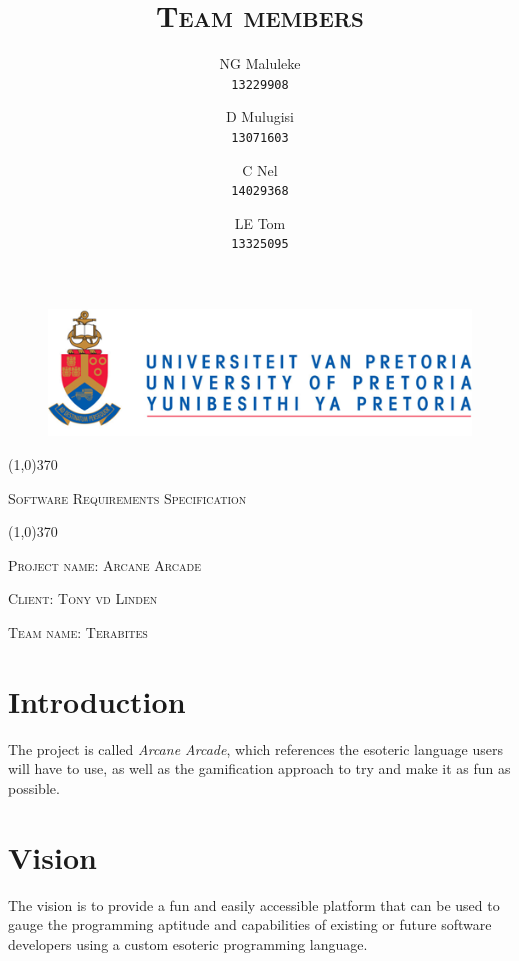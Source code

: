 \documentclass[english]{article}
\title{\scshape\Large Team members}
\author{
	NG Maluleke\\
	\texttt{13229908}
	\and
	D Mulugisi\\
	\texttt{13071603}
	\and
	C Nel\\
	\texttt{14029368}
	\and
	LE Tom\\
	\texttt{13325095}
}
\begin{document}
	
	\begin{figure}
		\includegraphics[width=\linewidth]{up_logo.png}
	\end{figure}
	
	\begin{center}
	 \line(1,0){370}
	\\[0.2cm]
    {\scshape\Large Software Requirements Specification \par}
	\vspace{0.1cm}
	\line(1,0){370}
	\\[0.8cm]
	
	{\scshape\large Project name: Arcane Arcade\par}	
	\vspace{1cm}
	{\scshape\large Client: Tony vd Linden\par}
	\vspace{1cm}
	{\scshape\large Team name: Terabites\par}
	\vspace{1cm}
	{\let\newpage\relax\maketitle}
	\end{center}
	
	
	\newpage
	\tableofcontents
	\newpage
	
	\section{Introduction}
		 The project is called \textit{Arcane Arcade}, which references the esoteric language users will have to use, as well as the gamification approach to try and make it as fun as possible.

	\section{Vision}
		The vision is to provide a fun and easily accessible platform that can be used to gauge the programming aptitude and capabilities of existing or future software developers using a custom esoteric programming language.
\end{document}
